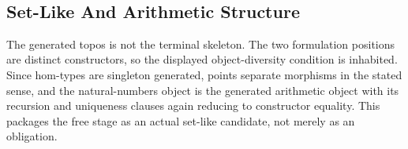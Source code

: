 \documentclass[11pt]{article}
\begin{document}
\begin{code}
\AgdaSpace{}%
\AgdaSymbol{=}\AgdaSpace{}%
\<%
\\
%
\>[2]\AgdaSymbol{\}}\<%
\\
%
\\[\AgdaEmptyExtraSkip]%
\>[0]\<%
\\
\>[0]\AgdaSpace{}%
\AgdaSymbol{:}\AgdaSpace{}%
\AgdaSpace{}%
\<%
\\
\>[0]\AgdaSpace{}%
\AgdaSymbol{=}\AgdaSpace{}%
\<%
\\
\>[0][@{}l@{\AgdaIndent{0}}]%
\>[2]\AgdaSymbol{\{}\AgdaSpace{}%
%
\>[28]\AgdaSymbol{=}\AgdaSpace{}%
\<%
\\
%
\>[2]\AgdaSymbol{;}\AgdaSpace{}%
%
\>[28]\AgdaSymbol{=}\AgdaSpace{}%
\<%
\\
%
\>[2]\AgdaSymbol{;}\AgdaSpace{}%
%
\>[28]\AgdaSymbol{=}\AgdaSpace{}%
\<%
\\
%
\>[2]\AgdaSymbol{;}\AgdaSpace{}%
%
\>[28]\AgdaSymbol{=}\AgdaSpace{}%
\<%
\\
%
\>[2]\AgdaSymbol{;}\AgdaSpace{}%
\AgdaSpace{}%
\AgdaSymbol{=}\AgdaSpace{}%
\<%
\\
%
\>[2]\AgdaSymbol{\}}\<%
\end{code}

\subsection{Set-Like And Arithmetic Structure}

The generated topos is not the terminal skeleton.  The two formulation
positions are distinct constructors, so the displayed object-diversity
condition is inhabited.  Since hom-types are singleton generated, points
separate morphisms in the stated sense, and the natural-numbers object is
the generated arithmetic object with its recursion and uniqueness clauses
again reducing to constructor equality.  This packages the free stage as
an actual set-like candidate, not merely as an obligation.
\end{document}
